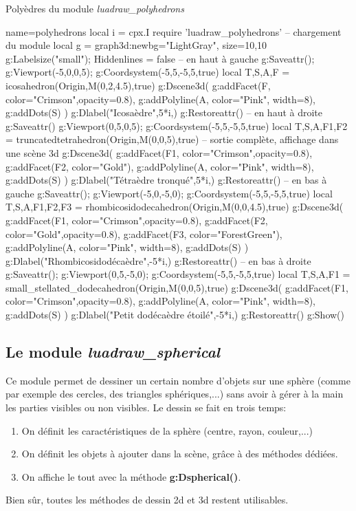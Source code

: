 \begin{demo}{Polyèdres du module \emph{luadraw\_polyhedrons}}
\begin{luadraw}{name=polyhedrons}
local i = cpx.I
require 'luadraw_polyhedrons' -- chargement du module
local g = graph3d:new{bg="LightGray", size={10,10}}
g:Labelsize("small"); Hiddenlines = false
-- en haut à gauche 
g:Saveattr(); g:Viewport(-5,0,0,5); g:Coordsystem(-5,5,-5,5,true)
local T,S,A,F = icosahedron(Origin,M(0,2,4.5),true) 
g:Dscene3d(
    g:addFacet(F, {color="Crimson",opacity=0.8}),
    g:addPolyline(A, {color="Pink", width=8}),
    g:addDots(S) )
g:Dlabel("Icosaèdre",5*i,{})
g:Restoreattr()
-- en haut à droite
g:Saveattr()
g:Viewport(0,5,0,5); g:Coordsystem(-5,5,-5,5,true)
local T,S,A,F1,F2 = truncatedtetrahedron(Origin,M(0,0,5),true) -- sortie complète, affichage dans une scène 3d
g:Dscene3d(
    g:addFacet(F1, {color="Crimson",opacity=0.8}),
    g:addFacet(F2, {color="Gold"}),
    g:addPolyline(A, {color="Pink", width=8}),
    g:addDots(S) )
g:Dlabel("Tétraèdre tronqué",5*i,{})
g:Restoreattr()
-- en bas à gauche
g:Saveattr(); g:Viewport(-5,0,-5,0); g:Coordsystem(-5,5,-5,5,true)
local T,S,A,F1,F2,F3 = rhombicosidodecahedron(Origin,M(0,0,4.5),true)
g:Dscene3d(
    g:addFacet(F1, {color="Crimson",opacity=0.8}),
    g:addFacet(F2, {color="Gold",opacity=0.8}), g:addFacet(F3, {color="ForestGreen"}),
    g:addPolyline(A, {color="Pink", width=8}), g:addDots(S) )
g:Dlabel("Rhombicosidodécaèdre",-5*i,{})
g:Restoreattr()
-- en bas à droite
g:Saveattr(); g:Viewport(0,5,-5,0); g:Coordsystem(-5,5,-5,5,true)
local T,S,A,F1 = small_stellated_dodecahedron(Origin,M(0,0,5),true)
g:Dscene3d(
    g:addFacet(F1, {color="Crimson",opacity=0.8}),
    g:addPolyline(A, {color="Pink", width=8}),
    g:addDots(S) )
g:Dlabel("Petit dodécaèdre étoilé",-5*i,{})
g:Restoreattr()
g:Show()
\end{luadraw}

\end{demo}

\subsection{Le module \emph{luadraw\_spherical}}

Ce module permet de dessiner un certain nombre d'objets sur une sphère (comme par exemple des cercles, des triangles sphériques,...) sans avoir à gérer à la main les parties visibles ou non visibles. Le dessin se fait en trois temps:
\begin{enumerate}
    \item On définit les caractéristiques de la sphère (centre, rayon, couleur,...)
    \item On définit les objets à ajouter dans la scène, grâce à des méthodes dédiées.
    \item On affiche le tout avec la méthode \textbf{g:Dspherical()}.
\end{enumerate}
Bien sûr, toutes les méthodes de dessin 2d et 3d restent utilisables.

